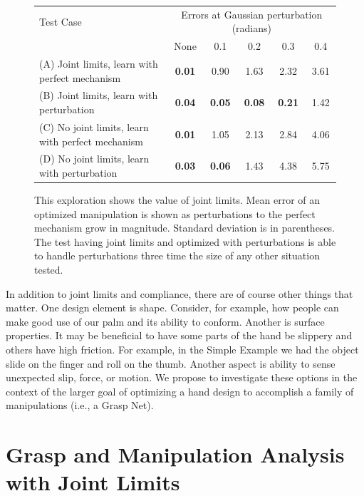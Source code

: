 \begin{figure}
\begin{center}
\begin{tabular}{l|c|c|c|c|c|}
Test Case & \multicolumn{5}{c}{Errors at Gaussian perturbation (radians)}  \\
                & None & 0.1  & 0.2  & 0.3  &  0.4  \\ \hline 
(A) Joint limits, learn with perfect mechanism &	{\bf 0.01} & 0.90 & 1.63 &	2.32 & 3.61 \\
(B) Joint limits, learn with perturbation	&  {\bf 0.04}	& {\bf 0.05}	& {\bf 0.08} &	{\bf 0.21} &	1.42 \\
(C) No joint limits, learn with perfect mechanism &	{\bf 0.01}	&	1.05&	2.13	& 2.84  &	4.06 \\
(D) No joint limits, learn with perturbation &	{\bf 0.03}	& {\bf 0.06} 	&1.43	&4.38	&5.75 \\
\end{tabular}
\end{center}
\vspace*{-0.2in}
\caption{\small This exploration shows the value of joint limits.   Mean error of an optimized manipulation is shown as perturbations to the perfect mechanism grow in magnitude.    Standard deviation is in parentheses.  The test having joint limits and optimized with perturbations is able to handle perturbations three time the size of any other situation tested.}
\label{JointLimitAnalysis}
\end{figure}

In addition to joint limits and compliance, there are of course other things that matter.   One design element is shape.   Consider, for example, how people can make good use of our palm and its ability to conform.    Another is surface properties.   It may be beneficial to have some parts of the hand be slippery and others have high friction.   For example, in the Simple Example we had the object slide on the finger and roll on the thumb.   Another aspect is ability to sense unexpected slip, force, or motion.    We propose to investigate these options in the context of the larger goal of optimizing a hand design to accomplish a family of manipulations (i.e., a Grasp Net).

\section{Grasp and Manipulation Analysis with Joint Limits}
   \label{secLimitAnalysis}

